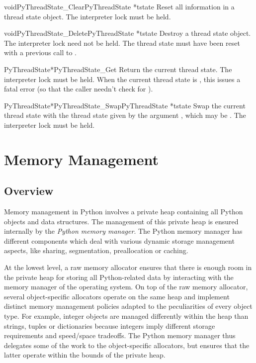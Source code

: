 \documentclass{manual}
\begin{document}
\begin{cfuncdesc}{void}{PyThreadState_Clear}{PyThreadState *tstate}
Reset all information in a thread state object.  The interpreter lock
must be held.
\end{cfuncdesc}

\begin{cfuncdesc}{void}{PyThreadState_Delete}{PyThreadState *tstate}
Destroy a thread state object.  The interpreter lock need not be
held.  The thread state must have been reset with a previous
call to .
\end{cfuncdesc}

\begin{cfuncdesc}{PyThreadState*}{PyThreadState_Get}{}
Return the current thread state.  The interpreter lock must be held.
When the current thread state is \NULL{}, this issues a fatal
error (so that the caller needn't check for \NULL{}).
\end{cfuncdesc}

\begin{cfuncdesc}{PyThreadState*}{PyThreadState_Swap}{PyThreadState *tstate}
Swap the current thread state with the thread state given by the
argument , which may be \NULL{}.  The interpreter lock
must be held.
\end{cfuncdesc}


\chapter{Memory Management \label{memory}}


\section{Overview \label{memoryOverview}}

Memory management in Python involves a private heap containing all
Python objects and data structures. The management of this private
heap is ensured internally by the \emph{Python memory manager}.  The
Python memory manager has different components which deal with various
dynamic storage management aspects, like sharing, segmentation,
preallocation or caching.

At the lowest level, a raw memory allocator ensures that there is
enough room in the private heap for storing all Python-related data
by interacting with the memory manager of the operating system. On top
of the raw memory allocator, several object-specific allocators
operate on the same heap and implement distinct memory management
policies adapted to the peculiarities of every object type. For
example, integer objects are managed differently within the heap than
strings, tuples or dictionaries because integers imply different
storage requirements and speed/space tradeoffs. The Python memory
manager thus delegates some of the work to the object-specific
allocators, but ensures that the latter operate within the bounds of
the private heap.
\end{document}
